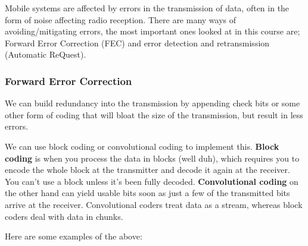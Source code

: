 Mobile systems are affected by errors in the transmission of data, often in the
form of noise affecting radio reception. There are many ways of
avoiding/mitigating errors, the most important ones looked at in this course
are; Forward Error Correction (FEC) and error detection and retransmission
(Automatic ReQuest).

\subsubsection{Forward Error Correction}

We can build redundancy into the transmission by appending check bits or some
other form of coding that will bloat the size of the transmission, but result in
less errors.

We can use block coding or convolutional coding to implement this. \textbf{Block
coding} is when you process the data in blocks (well duh), which requires you to
encode the whole block at the transmitter and decode it again at the receiver.
You can't use a block unless it's been fully decoded. \textbf{Convolutional
coding} on the other hand can yield usable bits soon as just a few of the
transmitted bits arrive at the receiver. Convolutional coders treat data as a
stream, whereas block coders deal with data in chunks.

Here are some examples of the above:

